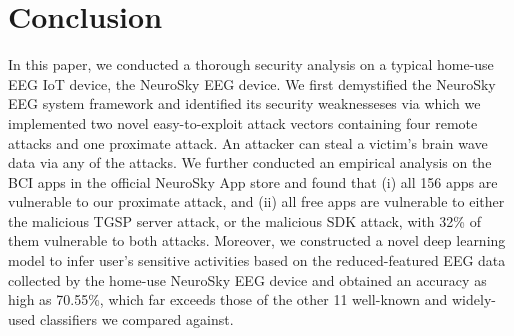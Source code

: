 \section{Conclusion}
\label{sec:conclusion}

In this paper, we conducted a thorough security analysis on a typical home-use EEG IoT device, the NeuroSky EEG device. We first demystified the NeuroSky EEG system framework and identified its security weaknesseses via which we implemented two novel easy-to-exploit attack vectors containing four remote attacks and one proximate attack. An attacker can steal a victim's brain wave data via any of the attacks. We further conducted an empirical analysis on the BCI apps in the official NeuroSky App store and found that (i) all 156 apps are vulnerable to our proximate attack, and (ii) all free apps are vulnerable to either the malicious TGSP server attack, or the malicious SDK attack, with 32\% of them vulnerable to both attacks. Moreover, we constructed a novel deep learning model to infer user's sensitive activities based on the reduced-featured EEG data collected by the home-use NeuroSky EEG device and obtained an accuracy as high as 70.55\%, which far exceeds those of the other 11 well-known and widely-used classifiers we compared against. 

